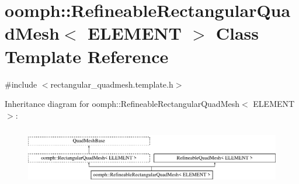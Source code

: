 \hypertarget{classoomph_1_1RefineableRectangularQuadMesh}{}\section{oomph\+:\+:Refineable\+Rectangular\+Quad\+Mesh$<$ E\+L\+E\+M\+E\+NT $>$ Class Template Reference}
\label{classoomph_1_1RefineableRectangularQuadMesh}


{\ttfamily \#include $<$rectangular\+\_\+quadmesh.\+template.\+h$>$}

Inheritance diagram for oomph\+:\+:Refineable\+Rectangular\+Quad\+Mesh$<$ E\+L\+E\+M\+E\+NT $>$\+:\begin{figure}[H]
\begin{center}
\leavevmode
\includegraphics[height=2.507463cm]{classoomph_1_1RefineableRectangularQuadMesh}
\end{center}
\end{figure}
